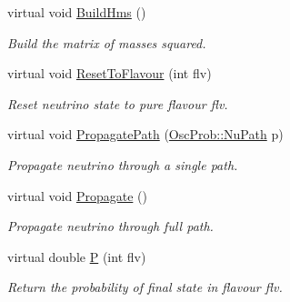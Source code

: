 \begin{DoxyCompactItemize}
virtual void \hyperlink{classOscProb_1_1PMNS__Base_ad0faf5eae755afb1baa1fcd5ffebad41}{Build\+Hms} ()
\begin{DoxyCompactList}\small\item\em Build the matrix of masses squared. \end{DoxyCompactList}\item 
virtual void \hyperlink{classOscProb_1_1PMNS__Base_ac0d4bf8ff1318ef96d3dafa62e0cec25}{Reset\+To\+Flavour} (int flv)
\begin{DoxyCompactList}\small\item\em Reset neutrino state to pure flavour flv. \end{DoxyCompactList}\item 
virtual void \hyperlink{classOscProb_1_1PMNS__Base_accb08503acc162188041d7a96a280462}{Propagate\+Path} (\hyperlink{structOscProb_1_1NuPath}{Osc\+Prob\+::\+Nu\+Path} p)
\begin{DoxyCompactList}\small\item\em Propagate neutrino through a single path. \end{DoxyCompactList}\item 
virtual void \hyperlink{classOscProb_1_1PMNS__Base_a054e3a8b05b9a958b6fa416e4a835e3e}{Propagate} ()
\begin{DoxyCompactList}\small\item\em Propagate neutrino through full path. \end{DoxyCompactList}\item 
virtual double \hyperlink{classOscProb_1_1PMNS__Base_a0dc4d45bc3d7e03b9abbf5b4e100cc22}{P} (int flv)
\begin{DoxyCompactList}\small\item\em Return the probability of final state in flavour flv. \end{DoxyCompactList}\end{DoxyCompactItemize}
